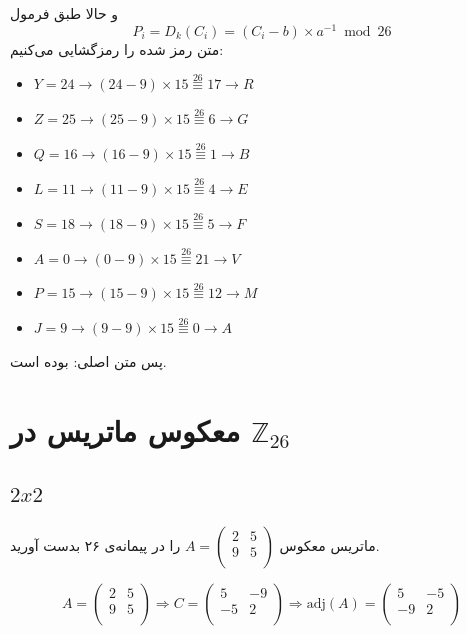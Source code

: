 \documentclass{article}
\newcommand{\modts}{\overset{26}{\equiv}}
\begin{document}
و حالا طبق فرمول
\begin{equation}
P_i = D_k(C_i) = (C_i - b) \times a^{-1} \bmod{26}
\end{equation}
متن رمز شده را رمزگشایی می‌کنیم:
\begin{latin}
\begin{itemize}
\item $Y = 24 \rightarrow (24 - 9)\times15 \modts 17 \rightarrow R$
\item $Z = 25 \rightarrow (25 - 9)\times15 \modts 6 \rightarrow G$
\item $Q = 16 \rightarrow (16 - 9)\times15 \modts 1 \rightarrow B$
\item $L = 11 \rightarrow (11 - 9)\times15 \modts 4 \rightarrow E$
\item $S = 18 \rightarrow (18 - 9)\times15 \modts 5 \rightarrow F$
\item $A = 0 \rightarrow (0 - 9)\times15 \modts 21 \rightarrow V$
\item $P = 15 \rightarrow (15 - 9)\times15 \modts 12 \rightarrow M$
\item $J = 9 \rightarrow (9 - 9)\times15 \modts 0 \rightarrow A$
\end{itemize}
\end{latin}
پس متن اصلی:
بوده است.

\section{معکوس ماتریس در $\mathbb{Z}_{26}$}
\subsection{$2x2$}
ماتریس معکوس 
$A = 
\begin{pmatrix}
2 & 5 \\
9 & 5 \\
\end{pmatrix}$
را در پیمانه‌ی ۲۶ بدست آورید.

\begin{equation*}
A = 
\begin{pmatrix}
2 & 5 \\
9 & 5 \\
\end{pmatrix} \Rightarrow 
C = 
\begin{pmatrix}
5 & -9 \\
-5 & 2 \\
\end{pmatrix} \Rightarrow 
\mathrm{adj}(A) = 
\begin{pmatrix}
5 & -5 \\
-9 & 2 \\
\end{pmatrix} 
\end{equation*}
\end{document}
